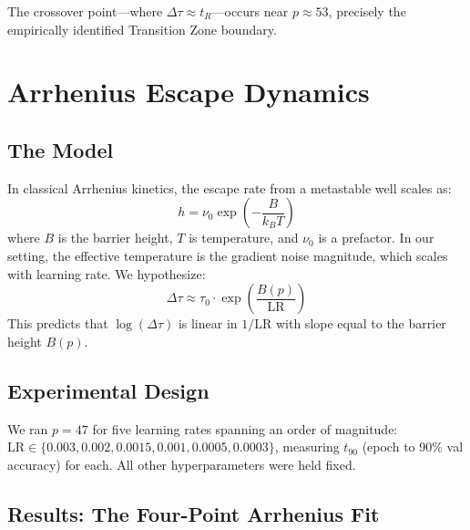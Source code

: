 \documentclass[11pt,twocolumn]{article}
\begin{document}
The crossover point---where $\Delta\tau \approx t_R$---occurs near $p \approx 53$, precisely the empirically identified Transition Zone boundary.

\section{Arrhenius Escape Dynamics}
\label{sec:arrhenius}

\subsection{The Model}

In classical Arrhenius kinetics, the escape rate from a metastable well scales as:
\begin{equation}
h = \nu_0 \exp\!\left(-\frac{B}{k_B T}\right)
\label{eq:arrhenius}
\end{equation}
where $B$ is the barrier height, $T$ is temperature, and $\nu_0$ is a prefactor. In our setting, the effective temperature is the gradient noise magnitude, which scales with learning rate. We hypothesize:
\begin{equation}
\boxed{\Delta\tau \approx \tau_0 \cdot \exp\!\left(\frac{B(p)}{\mathrm{LR}}\right)}
\label{eq:our_arrhenius}
\end{equation}
This predicts that $\log(\Delta\tau)$ is linear in $1/\mathrm{LR}$ with slope equal to the barrier height $B(p)$.

\subsection{Experimental Design}

We ran $p=47$ for five learning rates spanning an order of magnitude: $\mathrm{LR} \in \{0.003, 0.002, 0.0015, 0.001, 0.0005, 0.0003\}$, measuring $t_{90}$ (epoch to 90\% val accuracy) for each. All other hyperparameters were held fixed.

\subsection{Results: The Four-Point Arrhenius Fit}
\end{document}

